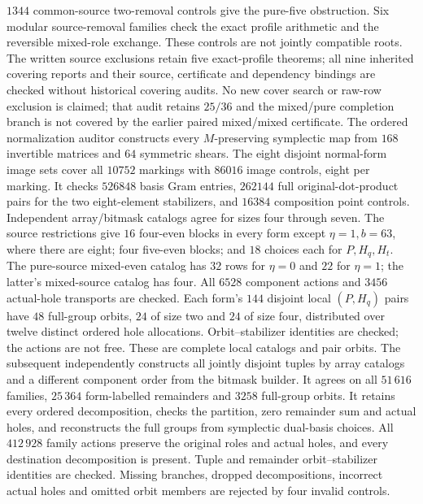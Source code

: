 $1344$ common-source two-removal controls give the pure-five
obstruction. Six modular source-removal families check the exact
profile arithmetic and the reversible mixed-role exchange.
These controls are not jointly compatible roots. The written
source exclusions retain five exact-profile theorems; all nine
inherited covering reports and their source, certificate and
dependency bindings are checked without historical covering
audits. No new cover search or raw-row exclusion is claimed;
that audit retains $25/36$ and the mixed/pure completion branch
is not covered by the earlier paired mixed/mixed certificate.
The ordered normalization auditor
constructs every $M$-preserving symplectic map from $168$ invertible
matrices and $64$ symmetric shears. The eight disjoint normal-form
image sets cover all $10752$ markings with $86016$ image controls,
eight per marking. It checks $526848$ basis Gram entries,
$262144$ full original-dot-product pairs for the two eight-element
stabilizers, and $16384$ composition point controls.
Independent array/bitmask catalogs agree for sizes four through
seven. The source restrictions give $16$ four-even blocks in
every form except $\eta=1,b=63$, where there are eight; four
five-even blocks; and $18$ choices each for $P,H_q,H_t$.
The pure-source mixed-even catalog has $32$ rows for $\eta=0$
and $22$ for $\eta=1$; the latter's mixed-source catalog has four.
All $6528$ component actions and $3456$ actual-hole transports
are checked. Each form's $144$ disjoint local $(P,H_q)$ pairs
have $48$ full-group orbits, $24$ of size two and $24$ of size
four, distributed over twelve distinct ordered hole allocations.
Orbit--stabilizer identities are checked; the actions are not free.
These are complete local catalogs and pair orbits. The subsequent
independently constructs all jointly disjoint tuples by array
catalogs and a different component order from the bitmask builder.
It agrees on all $51\,616$ families, $25\,364$ form-labelled
remainders and $3258$ full-group orbits. It retains every ordered
decomposition, checks the partition, zero remainder sum and
actual holes, and reconstructs the full groups from symplectic
dual-basis choices. All $412\,928$ family actions preserve the
original roles and actual holes, and every destination decomposition
is present. Tuple and remainder orbit--stabilizer identities are
checked. Missing branches, dropped decompositions, incorrect actual
holes and omitted orbit members are rejected by four invalid controls.
